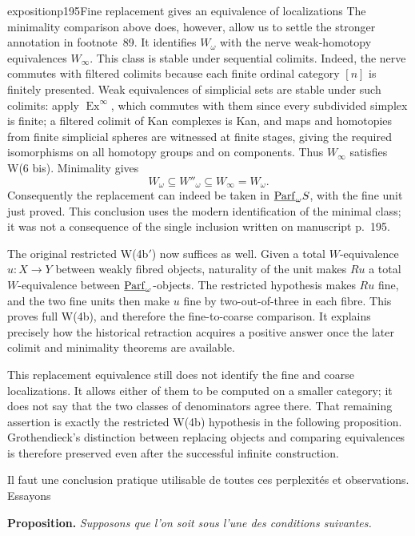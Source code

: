 \begin{dcomment}{exposition}{p195}{Fine replacement gives an equivalence of localizations}
The minimality comparison above does, however, allow us to settle the stronger annotation in footnote~89. It identifies $W_\omega$ with the nerve weak-homotopy equivalences $W_\infty$. This class is stable under sequential colimits. Indeed, the nerve commutes with filtered colimits because each finite ordinal category $[n]$ is finitely presented. Weak equivalences of simplicial sets are stable under such colimits: apply $\operatorname{Ex}^{\infty}$, which commutes with them since every subdivided simplex is finite; a filtered colimit of Kan complexes is Kan, and maps and homotopies from finite simplicial spheres are witnessed at finite stages, giving the required isomorphisms on all homotopy groups and on components. Thus $W_\infty$ satisfies W(6 bis). Minimality gives
\[
 W_\omega\subseteq W''_\omega\subseteq W_\infty=W_\omega.
\]
Consequently the replacement can indeed be taken in $\underline{\mathrm{Parf}}_\omega S$, with the fine unit just proved. This conclusion uses the modern identification of the minimal class; it was not a consequence of the single inclusion written on manuscript p.~195.

The original restricted W(4b$'$) now suffices as well. Given a total $W$-equivalence $u:X\to Y$ between weakly fibred objects, naturality of the unit makes $Ru$ a total $W$-equivalence between $\underline{\mathrm{Parf}}_\omega$-objects. The restricted hypothesis makes $Ru$ fine, and the two fine units then make $u$ fine by two-out-of-three in each fibre. This proves full W(4b), and therefore the fine-to-coarse comparison. It explains precisely how the historical retraction acquires a positive answer once the later colimit and minimality theorems are available.

This replacement equivalence still does not identify the fine and coarse localizations. It allows either of them to be computed on a smaller category; it does not say that the two classes of denominators agree there. That remaining assertion is exactly the restricted W(4b) hypothesis in the following proposition. Grothendieck's distinction between replacing objects and comparing equivalences is therefore preserved even after the successful infinite construction.
\end{dcomment}


Il faut une conclusion pratique utilisable de toutes ces perplexités et observations. Essayons

\textbf{Proposition.} \textit{Supposons que l'on soit sous l'une des conditions suivantes.}

